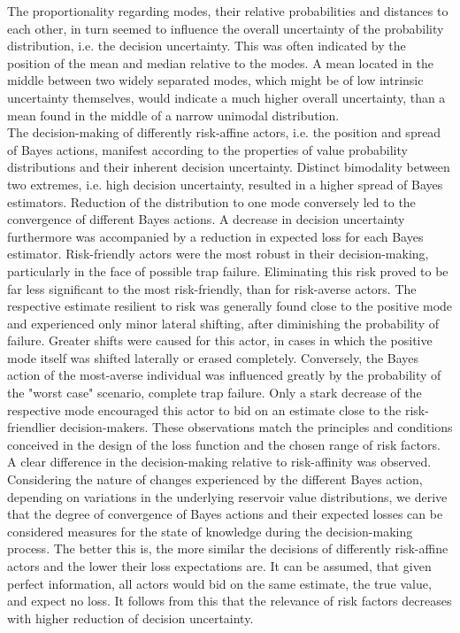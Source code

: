 	The proportionality regarding modes, their relative probabilities and distances to each other, in turn seemed to influence the overall uncertainty of the probability distribution, i.e. the decision uncertainty. This was often indicated by the position of the mean and median relative to the modes. A mean located in the middle between two widely separated modes, which might be of low intrinsic uncertainty themselves, would indicate a much higher overall uncertainty, than a mean found in the middle of a narrow unimodal distribution.\\	
	
	The decision-making of differently risk-affine actors, i.e. the position and spread of Bayes actions, manifest according to the properties of value probability distributions and their inherent decision uncertainty. Distinct bimodality between two extremes, i.e. high decision uncertainty, resulted in a higher spread of Bayes estimators. Reduction of the distribution to one mode conversely led to the convergence of different Bayes actions. A decrease in decision uncertainty furthermore was accompanied by a reduction in expected loss for each Bayes estimator. Risk-friendly actors were the most robust in their decision-making, particularly in the face of possible trap failure. Eliminating this risk proved to be far less significant to the most risk-friendly, than for risk-averse actors. The respective estimate resilient to risk was generally found close to the positive mode and experienced only minor lateral shifting, after diminishing the probability of failure. Greater shifts were caused for this actor, in cases in which the positive mode itself was shifted laterally or erased completely. Conversely, the Bayes action of the most-averse individual was influenced greatly by the probability of the "worst case" scenario, complete trap failure. Only a stark decrease of the respective mode encouraged this actor to bid on an estimate close to the risk-friendlier decision-makers. These observations match the principles and conditions conceived in the design of the loss function and the chosen range of risk factors. A clear difference in the decision-making relative to risk-affinity was observed.\\
	
	Considering the nature of changes experienced by the different Bayes action, depending on variations in the underlying reservoir value distributions, we derive that the degree of convergence of Bayes actions and their expected losses can be considered measures for the state of knowledge during the decision-making process. The better this is, the more similar the decisions of differently risk-affine actors and the lower their loss expectations are. It can be assumed, that given perfect information, all actors would bid on the same estimate, the true value, and expect no loss. It follows from this that the relevance of risk factors decreases with higher reduction of decision uncertainty.\\
			
